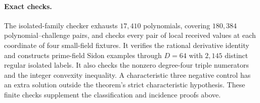 \paragraph{Exact checks.}
The isolated-family checker exhausts $17{,}410$ polynomials,
covering $180{,}384$ polynomial--challenge pairs, and checks every
pair of local received values at each coordinate of four small-field
fixtures. It verifies the rational derivative identity and constructs
prime-field Sidon examples through $D=64$ with $2{,}145$ distinct
regular isolated labels. It also checks the nonzero degree-four
triple numerators and the integer convexity inequality. A characteristic
three negative control has an extra solution outside the theorem's
strict characteristic hypothesis. These finite checks supplement
the classification and incidence proofs above.
